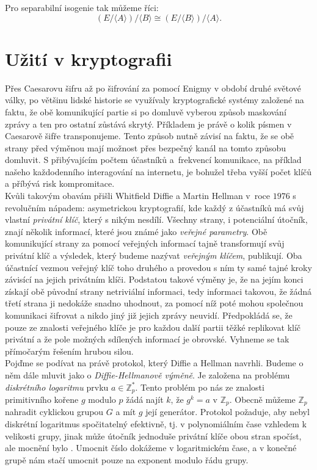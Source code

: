 \documentclass [12pt]{report}
\begin{document}
Pro separabilní isogenie tak můžeme říci:
\begin{equation*}
(E/ \langle A \rangle)/ \langle B \rangle \cong (E/ \langle B \rangle)/ \langle A \rangle.
\end{equation*}
 





\chapter{Užití v kryptografii}

Přes Caesarovu šifru až po šifrování za pomocí Enigmy v období druhé světové války, po většinu lidské historie se využívaly kryptografické systémy založené na faktu, že obě komunikující partie si po domluvě vyberou způsob maskování zprávy a ten pro ostatní zůstává skrytý. Příkladem je právě o kolik písmen v Caesarově šifře transponujeme. Tento způsob nutně závisí na faktu, že se obě strany před výměnou mají možnost přes bezpečný kanál na tomto způsobu domluvit. S přibývajícím počtem účastníků a~frekvencí komunikace, na příklad našeho každodenního interagování na internetu, je bohužel třeba vyšší počet klíčů a příbývá risk kompromitace.\\

Kvůli takovým obavám přišli Whitfield Diffie a Martin Hellman v~roce $1976$ s revolučním nápadem: asymetrickou kryptografií, kde každý z účastníků má svůj vlastní \textit{privátní klíč}, který s nikým nesdílí. Všechny strany, i potenciální útočník, znají několik informací, které jsou známé jako \textit{veřejné parametry}. Obě komunikující strany za pomocí veřejných informací tajně transformují svůj privátní klíč a výsledek, který budeme nazývat \textit{veřejným klíčem}, publikují. Oba účastnící vezmou veřejný klíč toho druhého a provedou s ním ty samé tajné kroky závisící na jejich privátním klíči. Podstatou takové výměny je, že na jejím konci získají obě původní strany netriviální informaci, tedy informaci takovou, že žádná třetí strana ji nedokáže snadno uhodnout, za pomocí níž poté mohou společnou komunikaci šifrovat a nikdo jiný již jejich zprávy neuvidí. Předpokládá se, že pouze ze znalosti veřejného klíče je pro každou další partii těžké replikovat klíč privátní a že pole možných sdílených informací je obrovské. Vyhneme se tak přímočarým řešením hrubou silou.\\

Pojďme se podívat na právě protokol, který Diffie a Hellman navrhli. Budeme o něm dále mluvit jako o \textit{Diffie-Hellmanově výměně}. Je založena na problému \textit{diskrétního logaritmu} prvku $a \in \mathbb{Z}_p^{*}$. Tento problém po nás ze znalosti primitivního kořene $g$ modulo $p$ žádá najít $k$, že $g^k = a$ v $\mathbb{Z}_p$. Obecně můžeme $\mathbb{Z}_p$ nahradit cyklickou grupou $G$ a mít $g$ její generátor. Protokol požaduje, aby nebyl diskrétní logaritmus spočitatelný efektivně, tj. v polynomiálním čase vzhledem k velikosti grupy, jinak může útočník jednoduše privátní klíče obou stran spočíst, ale mocnění bylo . Umocnit číslo dokážeme v logaritmickém čase, a v konečné grupě nám stačí umocnit pouze na exponent modulo řádu grupy. \\
\end{document}
